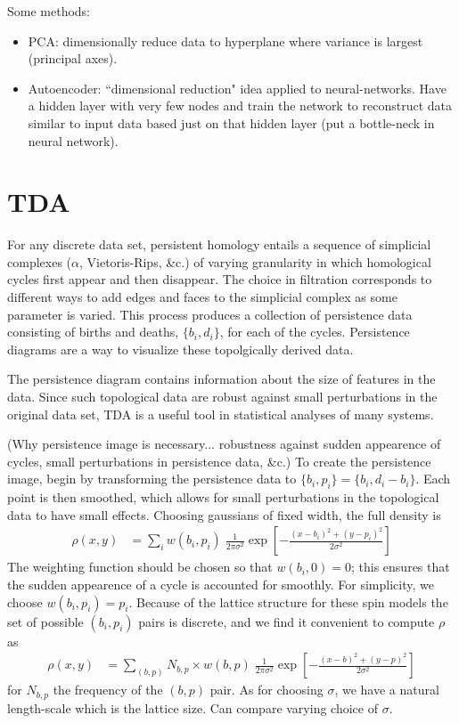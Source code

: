 \documentclass[11pt]{article}
\begin{document}
Some methods:
\begin{itemize}
    \item PCA: dimensionally reduce data to hyperplane where variance is largest (principal axes).
    \item Autoencoder: ``dimensional reduction" idea applied to neural-networks. Have a hidden layer with very few nodes and train the network to reconstruct data similar to input data based just on that hidden layer (put a bottle-neck in neural network).
\end{itemize}


\section{TDA}
For any discrete data set, persistent homology entails a sequence of simplicial complexes ($\alpha$, Vietoris-Rips, \&c.) of varying granularity in which homological cycles first appear and then disappear. The choice in filtration corresponds to different ways to add edges and faces to the simplicial complex as some parameter is varied. This process produces a collection of persistence data consisting of births and deaths, $\{b_i,d_i\}$, for each of the cycles. Persistence diagrams are a way to visualize these topolgically derived data.

The persistence diagram contains information about the size of features in the data. Since such topological data are robust against small perturbations in the original data set, TDA is a useful tool in statistical analyses of many systems.


(Why persistence image is necessary... robustness against sudden appearence of cycles, small perturbations in persistence data, \&c.) To create the persistence image, begin by transforming the persistence data to $\{b_i,p_i\}=\{b_i,d_i-b_i\}$. Each point is then smoothed, which allows for small perturbations in the topological data to have small effects. Choosing gaussians of fixed width, the full density is
\begin{align}
    \rho(x,y) &= \sum_i w(b_i,p_i)\;\frac{1}{2\pi\sigma^2}\exp\left[-\frac{(x-b_i)^2+(y-p_i)^2}{2\sigma^2}\right]
\end{align}
The weighting function should be chosen so that $w(b_i,0)=0$; this ensures that the sudden appearence of a cycle is accounted for smoothly. For simplicity, we choose $w(b_i,p_i)=p_i$. Because of the lattice structure for these spin models the set of possible $(b_i,p_i)$ pairs is discrete, and we find it convenient to compute $\rho$ as
\begin{align}
    \rho(x,y) &= \sum_{(b,p)}N_{b,p}\times w(b,p)\;\frac{1}{2\pi\sigma^2}\exp\left[-\frac{(x-b)^2+(y-p)^2}{2\sigma^2}\right]
\end{align}
for $N_{b,p}$ the frequency of the $(b,p)$ pair. As for choosing $\sigma$, we have a natural length-scale which is the lattice size. Can compare varying choice of $\sigma$.
\end{document}
